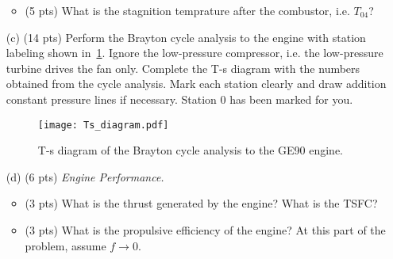 \documentclass[11pt]{article}
\begin{document}
\begin{itemize}
\begin{itemize}
		\item (5 pts) What is the stagnition temprature after the combustor, i.e. $T_{04}$?
		
	\end{itemize}
	
	\item[(c)] (14 pts) Perform the Brayton cycle analysis to the engine with station labeling shown in~\cref{fig:Ts}. Ignore the low-pressure compressor, i.e. the low-pressure turbine drives the fan only. Complete the T-s diagram with the numbers obtained from the cycle analysis. Mark each station clearly and draw addition constant pressure lines if necessary. Station 0 has been marked for you.
	
	\begin{figure}[ht]
		\centering
		\texttt{[image: Ts\_diagram.pdf]}
	    \caption{T-s diagram of the Brayton cycle analysis to the GE90 engine.}
		\label{fig:Ts}
	\end{figure}
	
	\item[(d)] (6 pts) \emph{Engine Performance.}
	\begin{itemize}
		\item (3 pts) What is the thrust generated by the engine? What is the TSFC?
		
		\item (3 pts) What is the propulsive efficiency of the engine? At this part of the problem, assume $f\rightarrow 0$.
	\end{itemize}
		
\end{itemize}



\end{document}
